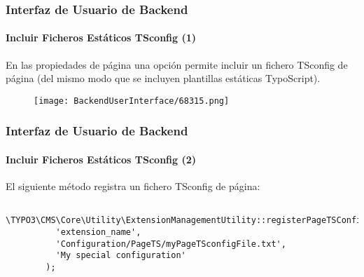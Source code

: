 \begin{frame}[fragile]
	\frametitle{Interfaz de Usuario de Backend}
	\framesubtitle{Incluir Ficheros Estáticos TSconfig (1)}

	En las propiedades de página una opción permite incluir un fichero TSconfig de página
	(del mismo modo que se incluyen plantillas estáticas TypoScript).

	\begin{figure}
		\texttt{[image: BackendUserInterface/68315.png]}
	\end{figure}

\end{frame}

\begin{frame}[fragile]
	\frametitle{Interfaz de Usuario de Backend}
	\framesubtitle{Incluir Ficheros Estáticos TSconfig (2)}

	\lstset{basicstyle=\tiny\ttfamily}

	El siguiente método registra un fichero TSconfig de página:

	\begin{lstlisting}
		\TYPO3\CMS\Core\Utility\ExtensionManagementUtility::registerPageTSConfigFile(
		  'extension_name',
		  'Configuration/PageTS/myPageTSconfigFile.txt',
		  'My special configuration'
		);
	\end{lstlisting}

\end{frame}

